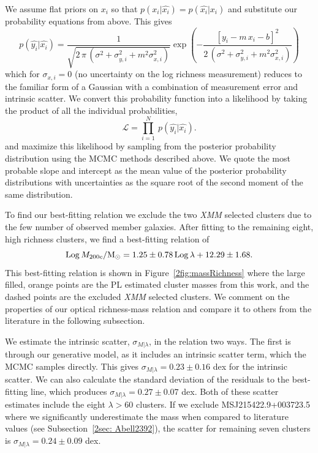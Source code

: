 We assume flat priors on $x_i$ so that $p(x_i|\hat{x_i}) = p(\hat{x_i}|x_i)$ and substitute our probability equations from above. This gives
\begin{equation}
	p(\hat{y_i}|\hat{x_i}) = 
	\frac{1}{\sqrt{2\,\pi\,(\sigma^2 + \sigma_{y,i}^2 + m^2\sigma_{x,i}^2)}}\exp\left(-\frac{[y_i - m\,x_i - b]^2}{2\,(\sigma^2 + \sigma_{y,i}^2 + m^2\sigma_{x,i}^2)}\right)
\end{equation}
which for $\sigma_{x,i}=0$ (no uncertainty on the log richness measurement) reduces to the familiar form of a Gaussian with a combination of measurement error and intrinsic scatter. We convert this probability function into a likelihood by taking the product of all the individual probabilities,  
\begin{equation}\label{2eq:like}
\mathscr{L} = \prod_{i=1}^N \ p(\hat{y_i}|\hat{x_i}).
\end{equation}
and maximize this likelihood by sampling from the posterior probability distribution using the MCMC methods described above. We quote the most probable slope and intercept as the mean value of the posterior probability distributions with uncertainties as the square root of the second moment of the same distribution.

To find our best-fitting relation we exclude the two \emph{XMM} selected clusters due to the few number of observed member galaxies. After fitting to the remaining eight, high richness clusters, we find a best-fitting relation of 
\begin{equation}\label{2eq: best fit}
 \mathrm{Log}\,M_{200c}/\hbox{$\mathrm{M}_\odot$} =1.25\pm{0.78}\, \mathrm{Log}\,\lambda + 12.29\pm{1.68}. 
\end{equation}
This best-fitting relation is shown in Figure~\ref{2fig:massRichness} where the large filled, orange points are the PL estimated cluster masses from this work, and the dashed points are the excluded \emph{XMM} selected clusters. We comment on the properties of our optical richness-mass relation and compare it to others from the literature in the following subsection.

We estimate the intrinsic scatter, $\sigma_{M|\lambda}$, in the relation two ways. The first is through our generative model, as it includes an intrinsic scatter term, which the MCMC samples directly. This gives $\sigma_{M|\lambda} = 0.23\pm0.16$ dex for the intrinsic scatter. We can also calculate the standard deviation of the residuals to the best-fitting line, which produces $\sigma_{M|\lambda} = 0.27\pm0.07$ dex. Both of these scatter estimates include the eight $\lambda > 60$ clusters. If we exclude MSJ215422.9+003723.5 where we significantly underestimate the mass when compared to literature values (see Subsection~\ref{2sec: Abell2392}), the scatter for remaining seven clusters is $\sigma_{M|\lambda} = 0.24\pm0.09$ dex.

